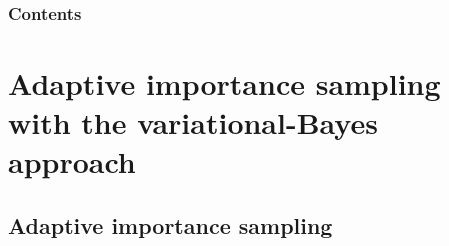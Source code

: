\documentclass[english]{beamer}
\begin{document}
{\begin{columns}[t]
\begin{center}
\end{center}


\end{columns}

}


\begin{frame}
\frametitle{Contents}
\tableofcontents
\end{frame}


\section{Adaptive importance sampling with the variational-Bayes approach}

\subsection{Adaptive importance sampling}
\end{document}
